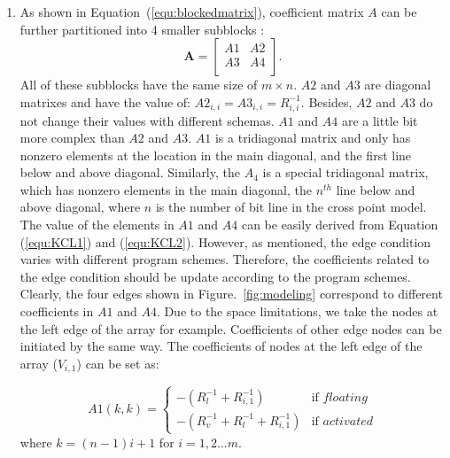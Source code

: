 \begin{enumerate}
  \item
  As shown in Equation~(\ref{equ:blockedmatrix}), coefficient matrix $A$ can be further partitioned into 4 smaller subblocks :
    \begin{equation}\label{equ:blockedmatrix}
        \mathbf{A} = \left[
        \begin{array}{cc}
            A1 & A2  \\
            A3 & A4  \\
        \end{array} \right].
    \end{equation}
All of these subblocks have the same size of $m\times n$. $A2$ and $A3$ are diagonal matrixes and have the value of: $A2_{i,i} = A3_{i,i} = R_{i,i}^{-1}$. Besides, $A2$ and $A3$ do not change their values with different schemas. $A1$ and $A4$ are a little bit more complex than $A2$ and $A3$. $A1$ is a tridiagonal matrix and only has nonzero elements at the location in the main diagonal, and the first line below and above diagonal. Similarly, the $A_4$ is a special tridiagonal matrix, which has nonzero elements in the main diagonal, the $n^{th}$ line below and above diagonal, where $n$ is the number of bit line in the cross point model.
The value of the elements in $A1$ and $A4$ can be easily derived from Equation (\ref{equ:KCL1}) and (\ref{equ:KCL2}). However, as mentioned, the edge condition varies with different program schemes. Therefore, the coefficients related to the edge condition should be update according to the program schemes. Clearly, the four edges shown in Figure.~\ref{fig:modeling} correspond to different coefficients in $A1$ and $A4$. Due to the space limitations, we take the nodes at the left edge of the array for example. Coefficients of other edge nodes can be initiated by the same way. The coefficients of nodes at the left edge of the array ($V_{i,1}$) can be set as:
    
    \begin{equation}
    A1(k,k) = \left\{
    \begin{array}{ll}
    -(R_l^{-1}+R_{i,1}^{-1})   & \text{if } floating\\
    -(R_v^{-1}+R_l^{-1}+R_{i,1}^{-1})& \text{if } activated
    \end{array} \right.
    \end{equation}
    where $k=(n-1)i+1$ for $i=1,2...m$.
    

\end{enumerate}
